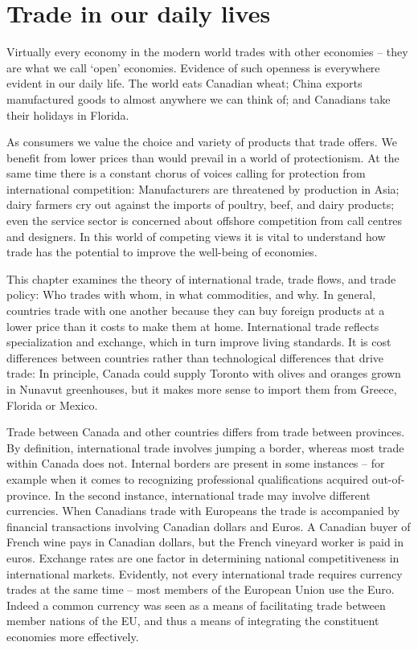 \section{Trade in our daily lives}\label{sec:ch15sec1}

Virtually every economy in the modern world trades with other economies --
they are what we call `open' economies. Evidence of such openness is
everywhere evident in our daily life. The world eats Canadian wheat; China
exports manufactured goods to almost anywhere we can think of; and Canadians
take their holidays in Florida.

As consumers we value the choice and variety of products that trade offers.
We benefit from lower prices than would prevail in a world of protectionism.
At the same time there is a constant chorus of voices calling for protection
from international competition: Manufacturers are threatened by production
in Asia; dairy farmers cry out against the imports of poultry, beef, and
dairy products; even the service sector is concerned about offshore
competition from call centres and designers. In this world of competing
views it is vital to understand how trade has the potential to improve the
well-being of economies.

This chapter examines the theory of international trade, trade flows, and
trade policy: Who trades with whom, in what commodities, and why. In
general, countries trade with one another because they can buy foreign
products at a lower price than it costs to make them at home. International
trade reflects specialization and exchange, which in turn improve living
standards. It is cost differences between countries rather than
technological differences that drive trade: In principle, Canada could
supply Toronto with olives and oranges grown in Nunavut greenhouses, but it
makes more sense to import them from Greece, Florida or Mexico.

Trade between Canada and other countries differs from trade between
provinces. By definition, international trade involves jumping a border,
whereas most trade within Canada does not. Internal borders are present in
some instances -- for example when it comes to recognizing professional
qualifications acquired out-of-province. In the second instance,
international trade may involve different currencies. When Canadians trade
with Europeans the trade is accompanied by financial transactions involving
Canadian dollars and Euros. A Canadian buyer of French wine pays in Canadian
dollars, but the French vineyard worker is paid in euros. Exchange rates are
one factor in determining national competitiveness in international markets.
Evidently, not every international trade requires currency trades at the
same time -- most members of the European Union use the Euro. Indeed a
common currency was seen as a means of facilitating trade between member
nations of the EU, and thus a means of integrating the constituent economies
more effectively.